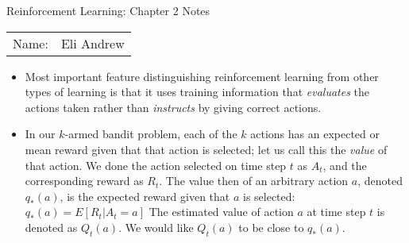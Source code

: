 \documentclass[12pt]{article}
\begin{document}
\begin{center}
{\Large Reinforcement Learning: Chapter 2 Notes}

\begin{tabular}{rl}
Name: & Eli Andrew
\end{tabular}
\end{center}

  \begin{itemize}
   \item Most important feature distinguishing reinforcement learning from other
   types of learning is that it uses training information that \textit{evaluates}
   the actions taken rather than \textit{instructs} by giving correct actions.
   \item In our $k$-armed bandit problem, each of the $k$ actions has an expected 
   or mean reward given that that action is selected; let us call this the \textit{value}
   of that action. We done the action selected on time step $t$ as $A_t$, and the 
   corresponding reward as $R_t$. The value then of an arbitrary action $a$, denoted
   $q_*(a)$, is the expected reward given that $a$ is selected: $q_*(a) = E[R_t | A_t=a]$
   The estimated value of action $a$ at time step $t$ is denoted as $Q_t(a)$. We would like
   $Q_t(a)$ to be close to $q_*(a)$.
    
  \end{itemize}
\end{document}
